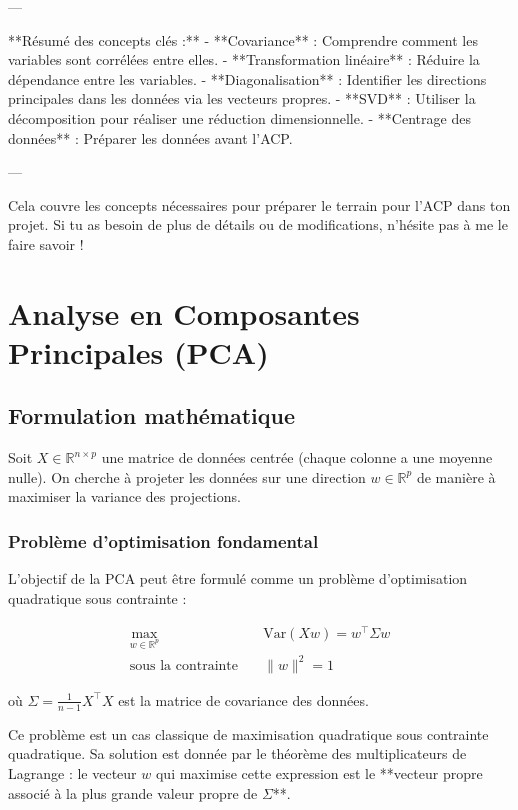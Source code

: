 \documentclass[a4paper,12pt]{report}
\begin{document}
---

**Résumé des concepts clés :**
- **Covariance** : Comprendre comment les variables sont corrélées entre elles.
- **Transformation linéaire** : Réduire la dépendance entre les variables.
- **Diagonalisation** : Identifier les directions principales dans les données via les vecteurs propres.
- **SVD** : Utiliser la décomposition pour réaliser une réduction dimensionnelle.
- **Centrage des données** : Préparer les données avant l'ACP.

---

Cela couvre les concepts nécessaires pour préparer le terrain pour l'ACP dans ton projet. Si tu as besoin de plus de détails ou de modifications, n’hésite pas à me le faire savoir !

\chapter{Analyse en Composantes Principales (PCA)}

\section{Formulation mathématique}

Soit \( X \in \mathbb{R}^{n \times p} \) une matrice de données centrée (chaque colonne a une moyenne nulle). On cherche à projeter les données sur une direction \( w \in \mathbb{R}^p \) de manière à maximiser la variance des projections.

\subsection{Problème d'optimisation fondamental}

L’objectif de la PCA peut être formulé comme un problème d’optimisation quadratique sous contrainte :

\begin{equation}
\begin{aligned}
\max_{w \in \mathbb{R}^p} \quad & \text{Var}(X w) = w^\top \Sigma w \\
\text{sous la contrainte} \quad & \|w\|^2 = 1
\end{aligned}
\end{equation}

où \( \Sigma = \frac{1}{n-1} X^\top X \) est la matrice de covariance des données.

Ce problème est un cas classique de maximisation quadratique sous contrainte quadratique. Sa solution est donnée par le théorème des multiplicateurs de Lagrange : le vecteur \( w \) qui maximise cette expression est le **vecteur propre associé à la plus grande valeur propre de \( \Sigma \)**.
\end{document}
